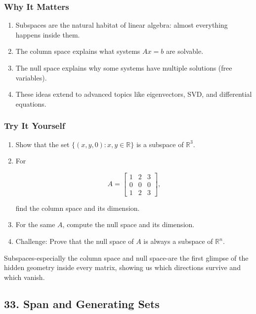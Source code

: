 \documentclass[
  letterpaper,
  DIV=11,
  numbers=noendperiod]{scrreprt}
\providecommand{\tightlist}{%
  \setlength{\itemsep}{0pt}\setlength{\parskip}{0pt}}
\begin{document}
\subsubsection{Why It Matters}\label{why-it-matters-28}

\begin{enumerate}
\def\labelenumi{\arabic{enumi}.}
\tightlist
\item
  Subspaces are the natural habitat of linear algebra: almost everything
  happens inside them.
\item
  The column space explains what systems \(Ax=b\) are solvable.
\item
  The null space explains why some systems have multiple solutions (free
  variables).
\item
  These ideas extend to advanced topics like eigenvectors, SVD, and
  differential equations.
\end{enumerate}

\subsubsection{Try It Yourself}\label{try-it-yourself-31}

\begin{enumerate}
\def\labelenumi{\arabic{enumi}.}
\item
  Show that the set \(\{(x,y,0) : x,y \in \mathbb{R}\}\) is a subspace
  of \(\mathbb{R}^3\).
\item
  For

  \[
  A = \begin{bmatrix}  
  1 & 2 & 3 \\  
  0 & 0 & 0 \\  
  1 & 2 & 3  
  \end{bmatrix},
  \]

  find the column space and its dimension.
\item
  For the same \(A\), compute the null space and its dimension.
\item
  Challenge: Prove that the null space of \(A\) is always a subspace of
  \(\mathbb{R}^n\).
\end{enumerate}

Subspaces-especially the column space and null space-are the first
glimpse of the hidden geometry inside every matrix, showing us which
directions survive and which vanish.

\subsection{33. Span and Generating
Sets}\label{span-and-generating-sets}
\end{document}
